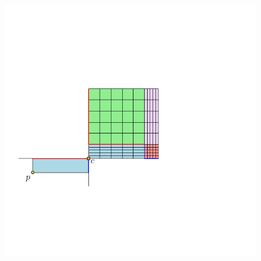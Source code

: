 \documentclass[12pt]{article}%
\begin{document}
\begin{figure}[h]
    \includegraphics[page=4]{figs/grid_2}
    \caption{}
\end{figure}
\end{document}
